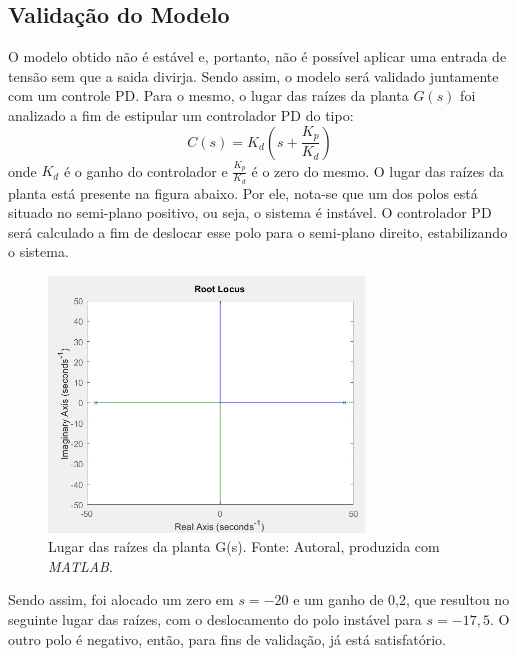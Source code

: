 \documentclass{ifacconf}
\begin{document}
\subsection{Validação do Modelo}
O modelo obtido não é estável e, portanto, não é possível aplicar uma entrada de tensão sem que a saida divirja. Sendo assim, o modelo será validado juntamente com um controle PD. Para o mesmo, o lugar das raízes da planta $G(s)$ foi analizado a fim de estipular um controlador PD do tipo:
\begin{equation}
    C(s) = K_d(s+\frac{K_p}{K_d})
\end{equation}
\noindent onde $K_d$ é o ganho do controlador e $\frac{K_p}{K_d}$ é o zero do mesmo.
O lugar das raízes da planta está presente na figura abaixo. Por ele, nota-se que um dos polos
está situado no semi-plano positivo, ou seja, o sistema é instável. O controlador
PD será calculado a fim de deslocar esse polo para o semi-plano direito, estabilizando o sistema.

\begin{figure}[!htb]
  \begin{center}
  \includegraphics[width=8.4cm]{figures/rloCUs.png}    %
  \caption{Lugar das raízes da planta G(s). Fonte: Autoral, produzida com \textit{MATLAB}.} 
  \label{fig:rlocus1}
  \end{center}
\end{figure}

Sendo assim, foi alocado um zero em $s = -20$ e um ganho de 0,2, que resultou no seguinte lugar das raízes, com o deslocamento do polo instável para $s = -17,5$. O outro polo é negativo, então, para fins de validação, já está satisfatório.
\end{document}
